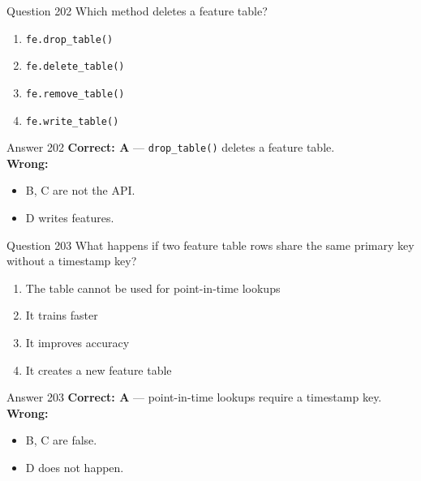 \documentclass[aspectratio=169,11pt]{beamer}
\begin{document}
	\begin{frame}{Question 202}
		Which method deletes a feature table?
		\begin{enumerate}[label=\Alph*.]
			\item \texttt{fe.drop\_table()}
			\item \texttt{fe.delete\_table()}
			\item \texttt{fe.remove\_table()}
			\item \texttt{fe.write\_table()}
		\end{enumerate}
	\end{frame}
	\begin{frame}{Answer 202}
		\textbf{Correct: A} --- \texttt{drop\_table()} deletes a feature table.\\
		\vspace{0.5em}
		\textbf{Wrong:}
		\begin{itemize}
			\item B, C are not the API.
			\item D writes features.
		\end{itemize}
	\end{frame}
	
	\begin{frame}{Question 203}
		What happens if two feature table rows share the same primary key without a timestamp key?
		\begin{enumerate}[label=\Alph*.]
			\item The table cannot be used for point-in-time lookups
			\item It trains faster
			\item It improves accuracy
			\item It creates a new feature table
		\end{enumerate}
	\end{frame}
	\begin{frame}{Answer 203}
		\textbf{Correct: A} --- point-in-time lookups require a timestamp key.\\
		\vspace{0.5em}
		\textbf{Wrong:}
		\begin{itemize}
			\item B, C are false.
			\item D does not happen.
		\end{itemize}
	\end{frame}
	
\end{document}

